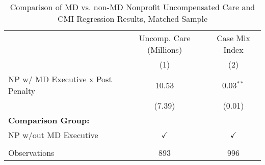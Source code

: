 \begin{table}[htbp]
   \caption{\label{tab:MD_noMD_uncomp_CMI_matchsample} Comparison of MD vs. non-MD Nonprofit Uncompensated Care and CMI Regression Results, Matched Sample}
   \bigskip
   \centering
   \begin{tabular}{lcc}
      \toprule
                                        & Uncomp. Care (Millions) & Case Mix Index\\  
                                        & (1)                     & (2)\\  
      \midrule 
      NP w/ MD Executive x Post Penalty & 10.53                   & 0.03$^{**}$\\   
                                        & (7.39)                  & (0.01)\\   
      \textbf{Comparison Group:}        &                         & \\  
      NP w/out MD Executive             & $\checkmark$            & $\checkmark$\\   
       \\
      Observations                      & 893                     & 996\\  
      \bottomrule
   \end{tabular}
\end{table}